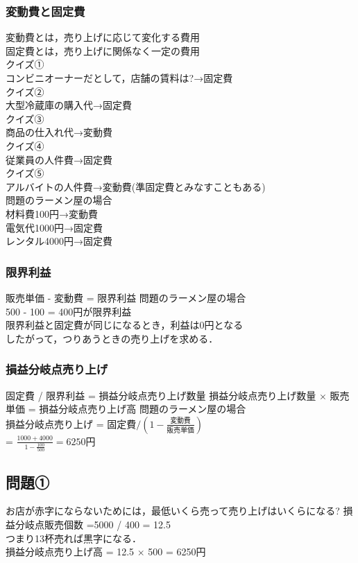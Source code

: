 \documentclass[a4paper,11pt]{ltjsarticle}
\begin{document}
\subsubsection{変動費と固定費}
変動費とは，売り上げに応じて変化する費用\\
固定費とは，売り上げに関係なく一定の費用\\
クイズ①\\
コンビニオーナーだとして，店舗の賃料は?→固定費\\
クイズ②\\
大型冷蔵庫の購入代→固定費\\
クイズ③\\
商品の仕入れ代→変動費\\
クイズ④\\
従業員の人件費→固定費\\
クイズ⑤\\
アルバイトの人件費→変動費(準固定費とみなすこともある)\\
問題のラーメン屋の場合\\
材料費100円→変動費\\
電気代1000円→固定費\\
レンタル4000円→固定費\\
\subsubsection{限界利益}
販売単価 - 変動費 = 限界利益
問題のラーメン屋の場合\\
500 - 100 = 400円が限界利益\\
限界利益と固定費が同じになるとき，利益は0円となる\\
したがって，つりあうときの売り上げを求める．
\subsubsection{損益分岐点売り上げ}
固定費 / 限界利益 = 損益分岐点売り上げ数量
損益分岐点売り上げ数量 $\times$ 販売単価 = 損益分岐点売り上げ高
問題のラーメン屋の場合\\
損益分岐点売り上げ = $\text{固定費} / ( 1 - \frac{\text{変動費}}{\text{販売単価}} )$\\
= $\frac{1000 + 4000}{1 - \frac{100}{500}} = 6250$円\\
\subsection{問題①}
お店が赤字にならないためには，最低いくら売って売り上げはいくらになる?
損益分岐点販売個数 =5000 / 400 = 12.5\\
つまり13杯売れば黒字になる．\\
損益分岐点売り上げ高 = 12.5 $\times$ 500 = 6250円
\end{document}
